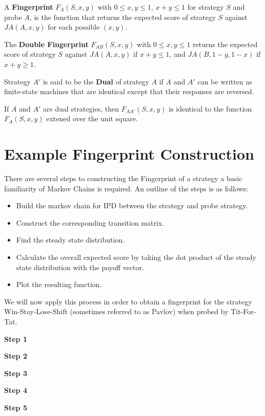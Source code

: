 \begin{definition}\label{def:fingerprint}
A \textbf{Fingerprint} $F_A(S, x, y)$ with $0 \leq x, y \leq 1$, $x+y \leq 1$ for strategy $S$ and probe $A$, is the function that returns the expected score of strategy $S$ against $JA(A, x, y)$ for each possible $(x, y)$.
\end{definition}

\begin{definition}\label{def:double-fingerprint}
The \textbf{Double Fingerprint} $F_{AB}(S, x, y)$ with $0 \leq x, y \leq 1$ returns the expected score of strategy $S$ against $JA(A, x, y)$ if $x+y \leq 1$, and $JA(B, 1-y, 1-x)$ if $x+y \geq 1$.
\end{definition}

\begin{definition}\label{def:dual}
Strategy $A'$ is said to be the \textbf{Dual} of strategy $A$ if $A$ and $A'$ can be written as finite-state machines that are identical except that their responses are reversed.
\end{definition}

\begin{theorem}\label{fingerprint-unit-square}
If $A$ and $A'$ are dual strategies, then $F_{AA'}(S, x, y)$ is identical to the function $F_A(S, x, y)$ extened over the unit square.
\end{theorem}


\section{Example Fingerprint Construction}

There are several steps to constructing the Fingerprint of a strategy a basic familiarity of Markov Chains is required.
An outline of the steps is as follows:

\begin{itemize}
    \item Build the markov chain for IPD between the strategy and probe strategy.
    \item Construct the corresponding transition matrix.
    \item Find the steady state distribution.
    \item Calculate the overall expected score by taking the dot product of the steady state distribution with the payoff vector.
    \item Plot the resulting function. 
\end{itemize}

We will now apply this process in order to obtain a fingerprint for the strategy Win-Stay-Lose-Shift (sometimes referred to as Pavlov) when probed by Tit-For-Tat.

\textbf{Step 1}

\textbf{Step 2}

\textbf{Step 3}

\textbf{Step 4}

\textbf{Step 5}